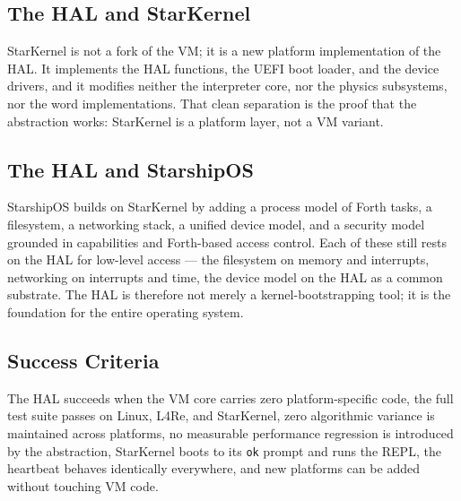 \subsection{The HAL and StarKernel}

StarKernel is not a fork of the VM; it is a new platform implementation of the
HAL. It implements the HAL functions, the UEFI boot loader, and the device
drivers, and it modifies neither the interpreter core, nor the physics
subsystems, nor the word implementations. That clean separation is the proof
that the abstraction works: StarKernel is a platform layer, not a VM variant.

\subsection{The HAL and StarshipOS}

StarshipOS builds on StarKernel by adding a process model of Forth tasks, a
filesystem, a networking stack, a unified device model, and a security model
grounded in capabilities and Forth-based access control. Each of these still
rests on the HAL for low-level access --- the filesystem on memory and
interrupts, networking on interrupts and time, the device model on the HAL as a
common substrate. The HAL is therefore not merely a kernel-bootstrapping tool;
it is the foundation for the entire operating system.

\subsection{Success Criteria}

The HAL succeeds when the VM core carries zero platform-specific code, the full
test suite passes on Linux, L4Re, and StarKernel, zero algorithmic variance is
maintained across platforms, no measurable performance regression is introduced
by the abstraction, StarKernel boots to its \texttt{ok} prompt and runs the
REPL, the heartbeat behaves identically everywhere, and new platforms can be
added without touching VM code.
